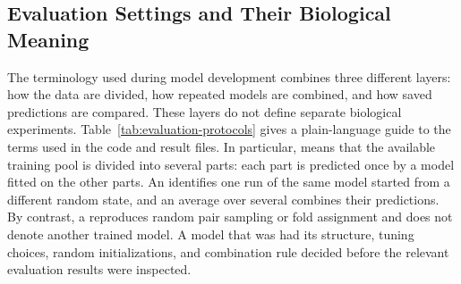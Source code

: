 \subsection{Evaluation Settings and Their Biological Meaning}

The terminology used during model development combines three different layers: how the data are divided, how repeated models are combined, and how saved predictions are compared. These layers do not define separate biological experiments. Table~\ref{tab:evaluation-protocols} gives a plain-language guide to the terms used in the code and result files. In particular, \plainOOF{} means that the available training pool is divided into several parts: each part is predicted once by a model fitted on the other parts. An \plainSeed{} identifies one run of the same model started from a different random state, and an average over several \plainSeeds{} combines their predictions. By contrast, a \plainSplitSeed{} reproduces random pair sampling or fold assignment and does not denote another trained model. A model that was \plainFrozen{} had its structure, tuning choices, random initializations, and combination rule decided before the relevant evaluation results were inspected.


